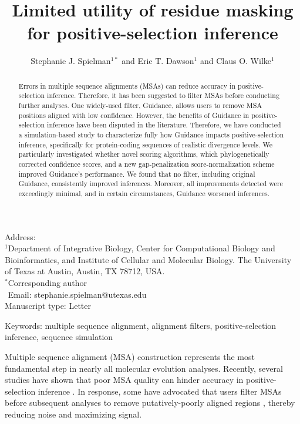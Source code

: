 \documentclass[11pt]{article}
\begin{document}
\title{\textbf{Limited utility of residue masking for positive-selection inference}}
\author{Stephanie J. Spielman$^{1*}$ and Eric T. Dawson$^{1}$ and Claus O. Wilke$^{1}$}
\date{}

\maketitle
\noindent
Address:\\
$^1$Department of Integrative Biology, Center for Computational Biology and Bioinformatics, and Institute of Cellular and Molecular Biology.
The University of Texas at Austin, Austin, TX 78712, USA.\\

\bigskip
\noindent
$^*$Corresponding author\\
$\phantom{^*}$Email: stephanie.spielman@utexas.edu\\

\bigskip
\noindent
Manuscript type: Letter

\bigskip
\noindent Keywords: multiple sequence alignment, alignment filters, positive-selection inference, sequence simulation

\newpage
\begin{abstract}
Errors in multiple sequence alignments (MSAs) can reduce accuracy in positive-selection inference. Therefore, it has been suggested to filter MSAs before conducting further analyses. One widely-used filter, Guidance, allows users to remove MSA positions aligned with low confidence. However, the benefits of Guidance in positive-selection inference have been disputed in the literature. Therefore, we have conducted a simulation-based study to characterize fully how Guidance impacts positive-selection inference, specifically for protein-coding sequences of realistic divergence levels. We particularly investigated whether novel scoring algorithms, which phylogenetically corrected confidence scores, and a new gap-penalization score-normalization scheme improved Guidance's performance. We found that no filter, including original Guidance, consistently improved inferences. Moreover, all improvements detected were exceedingly minimal, and in certain circumstances, Guidance worsened inferences. %
\end{abstract}

Multiple sequence alignment (MSA) construction represents the most fundamental step in nearly all molecular evolution analyses. Recently, several studies have shown that poor MSA quality can hinder accuracy in positive-selection inference \citep{Schneider2009, Fletcher2010, MarkovaRaina2011}. In response, some have advocated that users filter MSAs before subsequent analyses to remove putatively-poorly aligned regions \citep{Privman2012,Jordan2012}, thereby reducing noise and maximizing signal.
\end{document}
